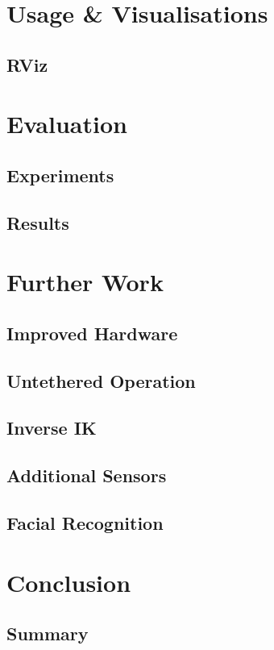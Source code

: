 \documentclass{l4proj}
\begin{document}
\chapter{Usage \& Visualisations}

\section{RViz}


\chapter{Evaluation}

\section{Experiments}
\section{Results}


\chapter{Further Work}

\section{Improved Hardware}
\section{Untethered Operation}
\section{Inverse IK}
\section{Additional Sensors}
\section{Facial Recognition}


\chapter{Conclusion}

\section{Summary}





\end{document}
